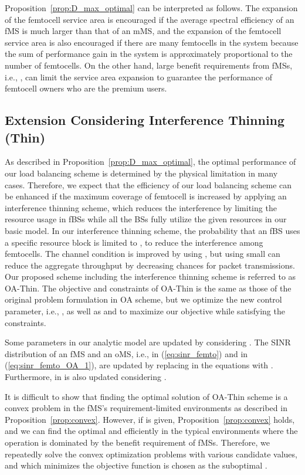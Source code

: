 \documentclass[journal]{IEEEtran}
\begin{document}
Proposition~\ref{prop:D_max_optimal} can be interpreted as follows.
The expansion of the femtocell service area is encouraged if the average spectral efficiency of
an fMS is much larger than that of an mMS,
and the expansion of the femtocell service area is also encouraged if there are many femtocells in
the system because the sum of performance gain in the system is approximately proportional to the number of femtocells.
On the other hand, large benefit requirements from
fMSs, i.e., , can limit the service area expansion to guarantee the performance of femtocell owners who are the premium users.

\subsection{Extension Considering Interference Thinning (Thin)}
\label{sec:interference_management}

As described in Proposition~\ref{prop:D_max_optimal}, the optimal performance of our load balancing
scheme is determined by the physical limitation  in many cases.
Therefore, we expect that the efficiency of our load balancing scheme can be enhanced
if  the maximum coverage of femtocell is increased by applying an interference thinning  scheme,
which reduces the interference by limiting the resource usage in fBSs while all the BSs fully utilize the given resources in our basic model.
In our interference thinning scheme,
the probability  that an fBS uses a specific resource block is limited to , to reduce the interference among femtocells.
The channel condition is improved by using , but using small  can reduce the aggregate throughput by decreasing chances for packet transmissions.
Our proposed scheme including the interference thinning scheme is referred to as OA-Thin.
The objective and constraints of OA-Thin is the same as those of the original problem formulation in OA scheme,
but we optimize the new control parameter, i.e., ,
as well as  and   to  maximize our objective while satisfying the constraints.

Some parameters in our analytic model are updated by considering .
The SINR distribution of an fMS and an oMS, i.e.,  in (\ref{eq:sinr_femto})
and  in (\ref{eq:sinr_femto_OA_1}), are updated by replacing
 in the equations with .
Furthermore,  in is also updated considering .

It is difficult to show that finding the optimal solution of OA-Thin scheme is a convex problem
in the fMS's requirement-limited environments as described in Proposition~\ref{prop:convex}.
However, if  is given, Proposition~\ref{prop:convex} holds, and
we can find the optimal  and  efficiently
in the typical environments where the operation is dominated by the benefit requirement
of fMSs.
Therefore, we  repeatedly solve the convex optimization problems with various candidate  values,
and  which minimizes the objective function is chosen as the suboptimal .
\end{document}

